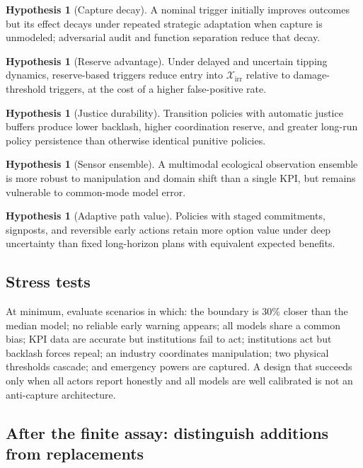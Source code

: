 \documentclass[11pt,a4paper]{article}
\numberwithin{equation}{section}
\theoremstyle{definition}
\newtheorem{hypothesis}[definition]{Hypothesis}
\theoremstyle{plain}
\theoremstyle{remark}
\newcommand{\irrev}{\mathcal{X}_{\mathrm{irr}}}
\begin{document}
\begin{hypothesis}[Capture decay]
A nominal trigger initially improves outcomes but its effect decays under repeated strategic adaptation when capture is unmodeled; adversarial audit and function separation reduce that decay.
\end{hypothesis}

\begin{hypothesis}[Reserve advantage]
Under delayed and uncertain tipping dynamics, reserve-based triggers reduce entry into $\irrev$ relative to damage-threshold triggers, at the cost of a higher false-positive rate.
\end{hypothesis}

\begin{hypothesis}[Justice durability]
Transition policies with automatic justice buffers produce lower backlash, higher coordination reserve, and greater long-run policy persistence than otherwise identical punitive policies.
\end{hypothesis}

\begin{hypothesis}[Sensor ensemble]
A multimodal ecological observation ensemble is more robust to manipulation and domain shift than a single KPI, but remains vulnerable to common-mode model error.
\end{hypothesis}

\begin{hypothesis}[Adaptive path value]
Policies with staged commitments, signposts, and reversible early actions retain more option value under deep uncertainty than fixed long-horizon plans with equivalent expected benefits.
\end{hypothesis}

\subsection{Stress tests}

At minimum, evaluate scenarios in which: the boundary is 30\% closer than the median model; no reliable early warning appears; all models share a common bias; KPI data are accurate but institutions fail to act; institutions act but backlash forces repeal; an industry coordinates manipulation; two physical thresholds cascade; and emergency powers are captured. A design that succeeds only when all actors report honestly and all models are well calibrated is not an anti-capture architecture.

\subsection{After the finite assay: distinguish additions from replacements}
\end{document}
